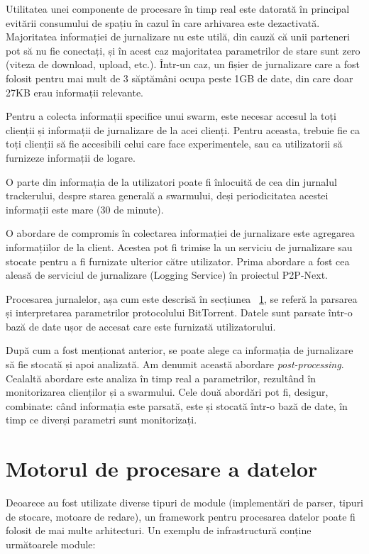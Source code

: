Utilitatea unei componente de procesare în timp real este datorată în
principal evitării consumului de spațiu în cazul în care arhivarea este
dezactivată. Majoritatea informației de jurnalizare nu este utilă, din cauză
că unii parteneri pot să nu fie conectați, și în acest caz majoritatea
parametrilor de stare sunt zero (viteza de download, upload, etc.). Într-un caz,
un fișier de jurnalizare care a fost folosit pentru mai mult de 3 săptămâni
ocupa peste 1GB de date, din care doar 27KB erau informații relevante.

Pentru a colecta informații specifice unui swarm, este necesar accesul la
toți clienții și informații de jurnalizare de la acei clienți. Pentru aceasta,
trebuie fie ca toți clienții să fie accesibili celui care face experimentele,
sau ca utilizatorii să furnizeze informații de logare.

O parte din informația de la utilizatori poate fi înlocuită de cea din jurnalul
trackerului, despre starea generală a swarmului, deși periodicitatea acestei informații este mare (30 de minute).

O abordare de compromis în colectarea informației de jurnalizare este agregarea
informațiilor de la client. Acestea pot fi trimise la un serviciu de
jurnalizare sau stocate pentru a fi furnizate ulterior către utilizator.
Prima abordare a fost cea aleasă de serviciul de jurnalizare (Logging Service)
în proiectul P2P-Next.

Procesarea jurnalelor, așa cum este descrisă în secțiunea
~\ref{sec:proto-measure:data-processing}, se referă la parsarea și interpretarea
parametrilor protocolului BitTorrent. Datele sunt parsate într-o bază de date
ușor de accesat care este furnizată utilizatorului.

După cum a fost menționat anterior, se poate alege ca informația de jurnalizare
să fie stocată și apoi analizată. Am denumit această abordare 
\textit{post-processing}. Cealaltă abordare este analiza în timp real a
parametrilor, rezultând în monitorizarea clienților și a swarmului. Cele două
abordări pot fi, desigur, combinate: când informația este parsată, este
și stocată într-o bază de date, în timp ce diverși parametri sunt monitorizați.

\section{Motorul de procesare a datelor}
\label{sec:proto-measure:data-processing}

Deoarece au fost utilizate diverse tipuri de module (implementări de parser,
tipuri de stocare, motoare de redare), un framework pentru procesarea datelor
poate fi folosit de mai multe arhitecturi. Un exemplu de infrastructură conține
următoarele module:

